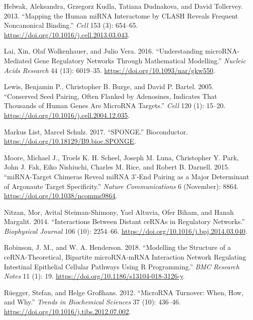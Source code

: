 \documentclass[]{article}
\begin{document}
\leavevmode\hypertarget{ref-helwak_mapping_2013}{}%
Helwak, Aleksandra, Grzegorz Kudla, Tatiana Dudnakova, and David
Tollervey. 2013. ``Mapping the Human miRNA Interactome by CLASH Reveals
Frequent Noncanonical Binding.'' \emph{Cell} 153 (3): 654--65.
\url{https://doi.org/10.1016/j.cell.2013.03.043}.

\leavevmode\hypertarget{ref-lai_understanding_2016}{}%
Lai, Xin, Olaf Wolkenhauer, and Julio Vera. 2016. ``Understanding
microRNA-Mediated Gene Regulatory Networks Through Mathematical
Modelling.'' \emph{Nucleic Acids Research} 44 (13): 6019--35.
\url{https://doi.org/10.1093/nar/gkw550}.

\leavevmode\hypertarget{ref-lewis_conserved_2005}{}%
Lewis, Benjamin P., Christopher B. Burge, and David P. Bartel. 2005.
``Conserved Seed Pairing, Often Flanked by Adenosines, Indicates That
Thousands of Human Genes Are MicroRNA Targets.'' \emph{Cell} 120 (1):
15--20. \url{https://doi.org/10.1016/j.cell.2004.12.035}.

\leavevmode\hypertarget{ref-markus_list_sponge_2017}{}%
Markus List, Marcel Schulz. 2017. ``SPONGE.'' Bioconductor.
\url{https://doi.org/10.18129/B9.bioc.SPONGE}.

\leavevmode\hypertarget{ref-moore_mirnatarget_2015}{}%
Moore, Michael J., Troels K. H. Scheel, Joseph M. Luna, Christopher Y.
Park, John J. Fak, Eiko Nishiuchi, Charles M. Rice, and Robert B.
Darnell. 2015. ``miRNA-Target Chimeras Reveal miRNA 3'-End Pairing as a
Major Determinant of Argonaute Target Specificity.'' \emph{Nature
Communications} 6 (November): 8864.
\url{https://doi.org/10.1038/ncomms9864}.

\leavevmode\hypertarget{ref-nitzan_interactions_2014}{}%
Nitzan, Mor, Avital Steiman-Shimony, Yael Altuvia, Ofer Biham, and Hanah
Margalit. 2014. ``Interactions Between Distant ceRNAs in Regulatory
Networks.'' \emph{Biophysical Journal} 106 (10): 2254--66.
\url{https://doi.org/10.1016/j.bpj.2014.03.040}.

\leavevmode\hypertarget{ref-robinson_modelling_2018}{}%
Robinson, J. M., and W. A. Henderson. 2018. ``Modelling the Structure of
a ceRNA-Theoretical, Bipartite microRNA-mRNA Interaction Network
Regulating Intestinal Epithelial Cellular Pathways Using R
Programming.'' \emph{BMC Research Notes} 11 (1): 19.
\url{https://doi.org/10.1186/s13104-018-3126-y}.

\leavevmode\hypertarget{ref-ruegger_microrna_2012}{}%
Rüegger, Stefan, and Helge Großhans. 2012. ``MicroRNA Turnover: When,
How, and Why.'' \emph{Trends in Biochemical Sciences} 37 (10): 436--46.
\url{https://doi.org/10.1016/j.tibs.2012.07.002}.
\end{document}

